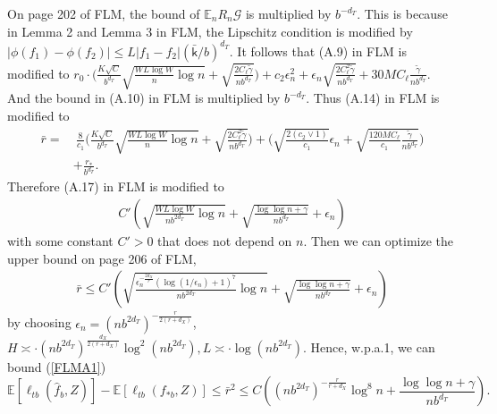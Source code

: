 \documentclass[lettersize, 12pt]{article}
\begin{document}
On page 202 of FLM, the bound of $\mathbb{E}_n R_n\mathcal{G}$ is multiplied by $b^{-d_T}$.
This is because in Lemma 2 and Lemma 3 in FLM, the Lipschitz condition is modified by
$|\phi(f_1) - \phi(f_2)| \leq L|f_1-f_2| (\bar{\mathsf{k}}/b)^{d_T}$.
It follows that 
(A.9) in FLM is modified to $r_0\cdot\Big(
\frac{K\sqrt{C}}{b^{d_T}} \sqrt{\frac{WL\log W}{n}\log n} + \sqrt{\frac{2C_\ell \tilde\gamma}{nb^{d_T}}}\Big)
+ c_2 \epsilon_n^2 + \epsilon_n\sqrt{\frac{2C_\ell^2 \tilde\gamma}{nb^{d_T}}} + 30MC_\ell\frac{\tilde\gamma}{nb^{d_T}}$.
And the bound in (A.10) in FLM is multiplied by $b^{-d_T}$.
Thus (A.14) in FLM is modified to 
\begin{align*}
\bar r =&\ \frac{8}{c_1}\bigg(\frac{K\sqrt{C}}{b^{d_T}}
\sqrt{\frac{WL\log W}{n} \log n} + \sqrt{\frac{2 C_\ell^2 \tilde \gamma}{nb^{d_T}}}
\bigg)
+  \bigg(
\sqrt{\frac{2 (c_2 \vee1)}{c_1}} \epsilon_n + \sqrt{\frac{120MC_\ell}{c_1} \frac{\tilde \gamma}{nb^{d_T}}}  \bigg)
\\
&+ \frac{r_\ast}{b^{d_T}}.
\end{align*}
Therefore (A.17) in FLM is modified to 
\begin{align*}
C'\left(
\sqrt{\frac{WL\log W}{nb^{2d_T}} \log n} 
+ 
\sqrt{\frac{\log\log n + \gamma}{nb^{d_T}}}
+ \epsilon_n 
\right)
\end{align*}
with some constant $C' >0$ that does not depend on $n$.
Then we can optimize the upper bound on page 206 of FLM,
\begin{align*}
\bar r \leq C'\left(
\sqrt{\frac{\epsilon_n^{-\frac{2d_X}{r}}(\log(1/\epsilon_n) + 1)^7}{nb^{2d_T}} \log n} 
+ 
\sqrt{\frac{\log\log n + \gamma}{nb^{d_T}}}
+ \epsilon_n
\right)
\end{align*}
by choosing $\epsilon_n = (nb^{2d_T})^{-\frac{r}{2(r+d_X)}}$, $H \asymp \cdot (nb^{2d_T})^{\frac{d_X}{2(r+d_X)}} \log^2(nb^{2d_T}), L\asymp \cdot \log(nb^{2d_T})$.
Hence, w.p.a.1, we can bound (\ref{FLMA1})
\[
\mathbb{E}[\ell_{tb}(\hat f_b, Z)] - \mathbb{E}[\ell_{tb}(f_{\ast b}, Z)]  
\leq \bar r^2 \leq C \left( (nb^{2d_T})^{-\frac{r}{r+d_X}} \log^8 n  + \frac{\log\log n + \gamma}{nb^{d_T}}\right).
\]
\end{document}
